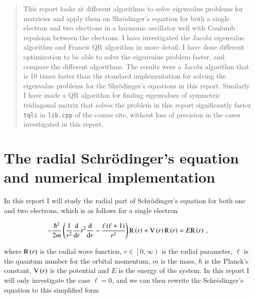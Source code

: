 \documentclass[11pt,english,a4paper]{article}
\begin{document}
\maketitle
\begin{flushleft}

\begin{abstract}
This report looks at different algorithms to solve eigenvalue problems for matricies and apply them on Shr\"{o}dinger's equation for both a single electron and two electrons in a harmonic oscillator well with Coulumb repulsion between the electrons. I have investigated the Jacobi eigenvalue algorithm  and Francis QR algorithm in more detail. I have done different optimization to be able to solve the eigenvalue problem faster, and compare the different algorithms. The results were a Jacobi algorithm that is 10 times faster than the standard implementation for solving the eigenvalue problems for the Shr\"{o}dinger's equations in this report. Similarly I have made a QR algorithm for finding eigenvalues of symmetric tridiagonal matrix that solves the problem in this report significantly faster \texttt{tqli} in \texttt{lib.cpp} of the course site, without loss of precision in the cases investigated in this report.
\end{abstract}

\section{The radial Schr\"{o}dinger's equation and numerical implementation}

In this report I will study the radial part of Schr\"{o}dinger's equation for both one and two electrons, which is as follows for a single electron

\begin{align*}
-\frac{\hbar^2}{2m}\left({\frac{1}{r^2} \frac{\mathrm{d}}{\mathrm{d}r}r^2\frac{\mathrm{d}}{\mathrm{d}r}-\frac{\ell\left({\ell+1}\right)}{r^2}}\right)\mathrm{R}\left({r}\right)+\mathrm{V}\left({r}\right)\mathrm{R}\left({r}\right) = E \mathrm{R}\left({r}\right) \,,
\end{align*}

where $\mathrm{R}\left({r}\right)$ is the radial wave function, $r\in\left[0,\infty\right)$ is the radial parameter, $\ell$ is the quantum number for the orbital momentum, $m$ is the mass, $\hbar$ is the Planck's constant, $\mathrm{V}\left({r}\right)$ is the potential and $E$ is the energy of the system. In this report I will only investigate the case $\ell = 0$, and we can then rewrite the Schr\"{o}dinger's equation to this simplified form


\end{flushleft}
\end{document}
